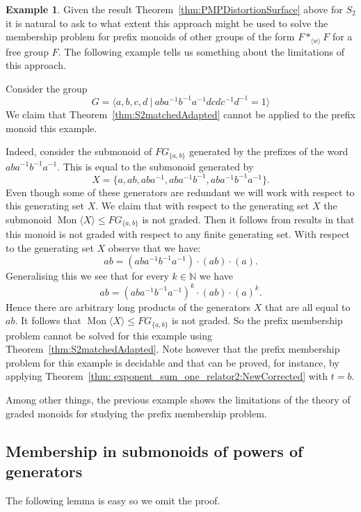 \documentclass[11pt]{amsart}
\newcommand{\Mgen}[1]{\operatorname{Mon}\bigl\langle #1 \bigr\rangle}
\newcommand{\Gpres}[2]{\bigl\langle #1\:|\:#2 \bigr\rangle}
\theoremstyle{plain}
\theoremstyle{definition}
\newtheorem{example}[theorem]{Example}
\begin{document}
\begin{example} Given the result Theorem~\ref{thm:PMPDistortionSurface} above for $S_2$ it is natural to ask to what extent this approach might be used to solve the membership problem for prefix monoids of other groups of the form $F \ast_{\langle w \rangle} F$ for a free group $F$. The following example tells us something about the limitations of this approach.    

Consider the group 
\[
  G = \Gpres{a,b,c,d}{aba^{-1}b^{-1}a^{-1} dcdc^{-1}d^{-1} = 1}
\]
We claim that Theorem~\ref{thm:S2matchedAdapted} cannot be applied to the prefix monoid this example.  

Indeed, consider the submonoid of $FG_{\{ a,b \}}$ generated by the prefixes of the word $aba^{-1}b^{-1}a^{-1}$. This is equal to the submonoid generated by 
\[
X = \{ a, ab, aba^{-1}, aba^{-1}b^{-1}, aba^{-1}b^{-1}a^{-1} \}. 
\]
Even though some of these generators are redundant we will work with respect to this generating set $X$. We claim that with respect to the generating set $X$ the submonoid $\Mgen{X} \leq FG_{ \{ a,b \}}$ is not graded. Then it follows from results in \cite{margolis2005distortion} that this monoid is not graded with respect to any finite generating set. With respect to the generating set $X$ observe that we have: 
\[
ab = (aba^{-1}b^{-1}a^{-1}) \cdot (ab) \cdot (a). 
\]
Generalising this we see that for every $k \in \mathbb{N}$ we have 
\[
ab = (aba^{-1}b^{-1}a^{-1})^k \cdot (ab) \cdot (a)^k. 
\]
Hence there are arbitrary long products of the generators $X$ that are all equal to $ab$. 
It follows that $\Mgen{X} \leq FG_{ \{ a,b \}}$ is not graded. 
So the prefix membership problem cannot be solved for this example using 
Theorem~\ref{thm:S2matchedAdapted}. 
Note however that the prefix membership problem for this example is decidable and that can be proved, for instance, 
by applying Theorem~\ref{thm: exponent_sum_one_relator2:NewCorrected} with $t=b$.  
\end{example}

Among other things, the previous example shows the limitations of the theory of graded monoids for studying the prefix membership problem. 

\subsection{Membership in submonoids of powers of generators}\label{sec: Membership on submonoids of powers of generators}

The following lemma is easy so we omit the proof. 
\end{document}
